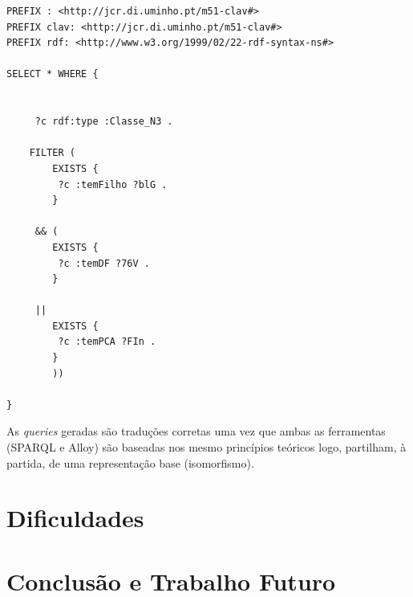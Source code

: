 \documentclass[tikz,runningheads,a4paper]{llncs}
\begin{document}
\begin{verbatim}
PREFIX : <http://jcr.di.uminho.pt/m51-clav#> 
PREFIX clav: <http://jcr.di.uminho.pt/m51-clav#> 
PREFIX rdf: <http://www.w3.org/1999/02/22-rdf-syntax-ns#> 

SELECT * WHERE {


	 ?c rdf:type :Classe_N3 . 

	FILTER ( 
		EXISTS { 	
		 ?c :temFilho ?blG . 
		} 

	 && (
		EXISTS { 	
		 ?c :temDF ?76V . 
		} 

	 || 
		EXISTS { 	
		 ?c :temPCA ?FIn . 
		} 
        ))

}
\end{verbatim}

As \textit{queries} geradas são traduções corretas uma vez que ambas as
ferramentas (SPARQL e Alloy) são baseadas nos mesmo princípios teóricos logo,
partilham, à partida, de uma representação base (isomorfismo).

\section{Dificuldades}



\section{Conclusão e Trabalho Futuro} \label{SecConclusion}

%
%
%
% 
% 
%

{}
\end{document}
